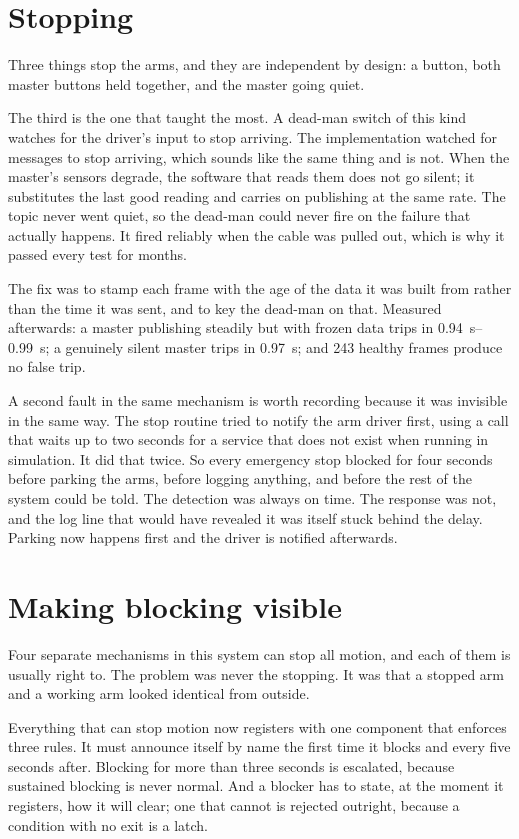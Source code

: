 \section{Stopping}

Three things stop the arms, and they are independent by design: a button, both
master buttons held together, and the master going quiet.

The third is the one that taught the most. A dead-man switch of this kind
watches for the driver's input to stop arriving. The implementation watched
for messages to stop arriving, which sounds like the same thing and is not.
When the master's sensors degrade, the software that reads them does not go
silent; it substitutes the last good reading and carries on publishing at the
same rate. The topic never went quiet, so the dead-man could never fire on the
failure that actually happens. It fired reliably when the cable was pulled out,
which is why it passed every test for months.

The fix was to stamp each frame with the age of the data it was built from
rather than the time it was sent, and to key the dead-man on that. Measured
afterwards: a master publishing steadily but with frozen data trips in
\SIrange{0.94}{0.99}{\second}; a genuinely silent master trips in
\SI{0.97}{\second}; and 243 healthy frames produce no false trip.

A second fault in the same mechanism is worth recording because it was
invisible in the same way. The stop routine tried to notify the arm driver
first, using a call that waits up to two seconds for a service that does not
exist when running in simulation. It did that twice. So every emergency stop
blocked for four seconds before parking the arms, before logging anything, and
before the rest of the system could be told. The detection was always on time.
The response was not, and the log line that would have revealed it was itself
stuck behind the delay. Parking now happens first and the driver is notified
afterwards.

\section{Making blocking visible}

Four separate mechanisms in this system can stop all motion, and each of them
is usually right to. The problem was never the stopping. It was that a stopped
arm and a working arm looked identical from outside.

Everything that can stop motion now registers with one component that enforces
three rules. It must announce itself by name the first time it blocks and
every five seconds after. Blocking for more than three seconds is escalated,
because sustained blocking is never normal. And a blocker has to state, at the
moment it registers, how it will clear; one that cannot is rejected outright,
because a condition with no exit is a latch.

